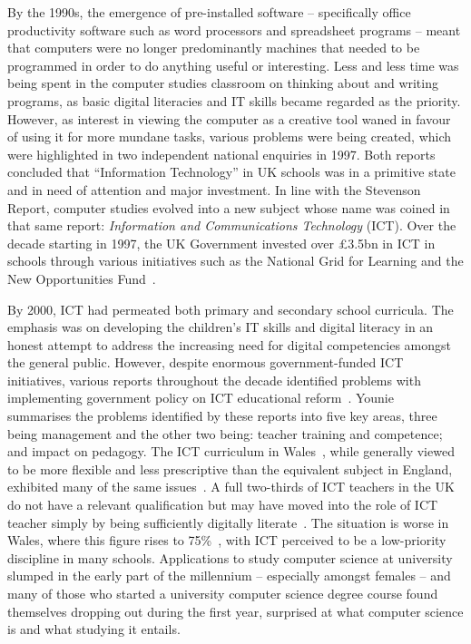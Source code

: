 \documentclass{llncs}
\begin{document}
By the 1990s, the emergence of pre-installed software -- specifically
office productivity software such as word processors and spreadsheet
programs -- meant that computers were no longer predominantly machines
that needed to be programmed in order to do anything useful or
interesting.  Less and less time was being spent in the computer
studies classroom on thinking about and writing programs, as basic
digital literacies and IT skills became regarded as the
priority. However, as interest in viewing the computer as a creative
tool waned in favour of using it for more mundane tasks, various
problems were being created, which were highlighted in two independent
national enquiries in 1997.  Both reports
concluded that ``Information Technology'' in UK schools was in a primitive
state and in need of attention and major investment. In line with the
Stevenson Report, computer studies evolved into a new subject whose
name was coined in that same report: {\emph{Information and
Communications Technology}} (ICT).  Over the decade starting in 1997,
the UK Government invested over \pounds3.5bn in ICT in schools through
various initiatives such as the National Grid for Learning and the New
Opportunities Fund~\cite{Doughty:2006}.


By 2000, ICT had permeated both primary and secondary school
curricula. The emphasis was on developing the children's IT skills and
digital literacy in an honest attempt to address the increasing need
for digital competencies amongst the general public.  However, despite
enormous government-funded ICT initiatives, various reports throughout
the decade identified problems with implementing government policy on
ICT educational
reform~\cite{OpieFukuyo:2000,Ofsted:2001,Ofsted:2002,Ofsted:2004,Loveless:2005}.
Younie~\cite{Younie:2006} summarises the problems identified by these
reports into five key areas, three being management and the other two
being: teacher training and competence; and impact on pedagogy. The
ICT curriculum in Wales~\cite{welshictcurric:2008}, while generally
viewed to be more flexible and less prescriptive than the equivalent
subject in England, exhibited many of the same
issues~\cite{estynict:2007,estynict:2013,estynict:2014}.  A full
two-thirds of ICT teachers in the UK do not have a relevant
qualification but may have moved into the role of ICT teacher simply
by being sufficiently digitally literate~\cite{RoyalSoc:2012}.  The
situation is worse in Wales, where this figure rises to
75\%~\cite{GTCW:2008}, with ICT perceived to be a low-priority
discipline in many schools. Applications to study computer science at
university slumped in the early part of the millennium -- especially
amongst females -- and many of those who started a university computer
science degree course found themselves dropping out during the first
year, surprised at what computer science is and what studying it
entails.
\end{document}
